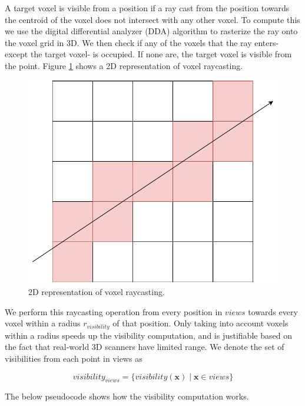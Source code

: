 A target voxel is visible from a position if a ray cast from the position towards the centroid of the voxel does not intersect with any other voxel. To compute this we use the digital differential analyzer (DDA) algorithm to rasterize the ray onto the voxel grid in 3D. We then check if any of the voxels that the ray enters- except the target voxel- is occupied. If none are, the target voxel is visible from the point. Figure \ref{fig:voxel_raycast} shows a 2D representation of voxel raycasting.

\begin{figure}[h]
    \centering
    \includegraphics*[width=.5\textwidth]{./fig/voxel_raycast.pdf}
    \caption{2D representation of voxel raycasting.}
    \label{fig:voxel_raycast}

\end{figure}
\clearpage

We perform this raycasting operation from every position in \(views\) towards every voxel within a radius \(r_{visibility}\) of that position. Only taking into account voxels within a radius speeds up the visibility computation, and is justifiable based on the fact that real-world 3D scanners have limited range. We denote the set of visibilities from each point in views as 

\begin{equation}
    \label{eq:visibility_views}
visibility_{views} = \{visibility(\boldsymbol{x}) \mid \boldsymbol{x} \in views\}
\end{equation}

The below pseudocode shows how the visibility computation works.

